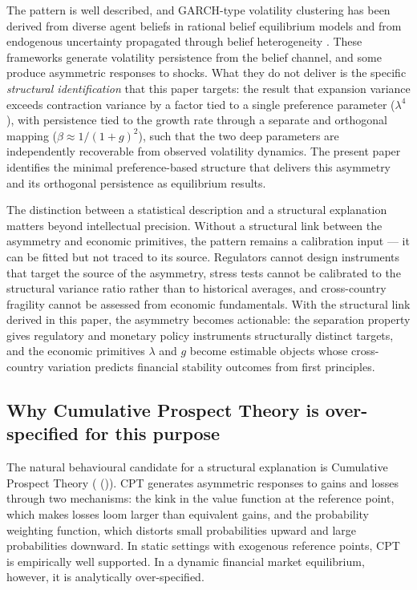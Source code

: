 \documentclass[12pt,a4paper]{article}
\theoremstyle{definition}
\begin{document}
The pattern is well described, and GARCH-type volatility clustering has
been derived from diverse agent beliefs in rational belief equilibrium
models \citep{brock1998,follmer2005} and from endogenous uncertainty
propagated through belief heterogeneity \citep{kurz2001}. These
frameworks generate volatility persistence from the belief channel, and
some produce asymmetric responses to shocks. What they do not deliver
is the specific \emph{structural identification} that this paper targets:
the result that expansion variance exceeds contraction variance by a
factor tied to a single preference parameter ($\lambda^4$), with
persistence tied to the growth rate through a separate and orthogonal
mapping ($\beta \approx 1/(1+g)^2$), such that the two deep parameters
are independently recoverable from observed volatility dynamics.
The present paper identifies the minimal preference-based structure
that delivers this asymmetry and its orthogonal persistence as
equilibrium results.

The distinction between a statistical description and a structural explanation
matters beyond intellectual precision. Without a structural link between the
asymmetry and economic primitives, the pattern remains a calibration input ---
it can be fitted but not traced to its source. Regulators cannot design
instruments that target the source of the asymmetry, stress tests cannot be
calibrated to the structural variance ratio rather than to historical averages,
and cross-country fragility cannot be assessed from economic fundamentals.
With the structural link derived in this paper, the asymmetry becomes
actionable: the separation property gives regulatory and monetary policy
instruments structurally distinct targets, and the economic primitives
$\lambda$ and $g$ become estimable objects whose cross-country variation
predicts financial stability outcomes from first principles.

\subsection{Why Cumulative Prospect Theory is over-specified for this purpose}
\label{sec:cpt}

The natural behavioural candidate for a structural explanation is Cumulative
Prospect Theory (\citeauthor{tversky1992} (\citeyear{tversky1992})). CPT generates asymmetric
responses to gains and losses through two mechanisms: the kink in the value
function at the reference point, which makes losses loom larger than equivalent
gains, and the probability weighting function, which distorts small probabilities
upward and large probabilities downward. In static settings with exogenous
reference points, CPT is empirically well supported. In a dynamic financial
market equilibrium, however, it is analytically over-specified.
\end{document}
